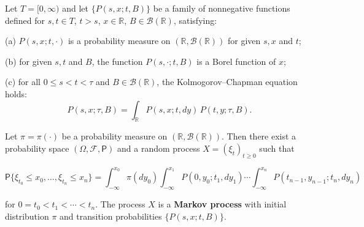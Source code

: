 Let $T = [0, \infty)$ and let $\{P(s, x; t, B)\}$ be a family of nonnegative functions defined for $s, t \in T$, $t > s$, $x \in \mathbb{R}$, $B \in \mathcal{B}(\mathbb{R})$, satisfying:

(a) $P(s, x; t, \cdot)$ is a probability measure on $(\mathbb{R}, \mathcal{B}(\mathbb{R}))$ for given $s, x$ and $t$;

(b) for given $s, t$ and $B$, the function $P(s, \cdot; t, B)$ is a Borel function of $x$;

(c) for all $0 \leq s < t < \tau$ and $B \in \mathcal{B}(\mathbb{R})$, the Kolmogorov–Chapman equation holds:
$$P(s, x; \tau, B) = \int_{\mathbb{R}} P(s, x; t, dy) \, P(t, y; \tau, B).$$

Let $\pi = \pi(\cdot)$ be a probability measure on $(\mathbb{R}, \mathcal{B}(\mathbb{R}))$. Then there exist a probability space $(\Omega, \mathcal{F}, \mathsf{P})$ and a random process $X = (\xi_t)_{t \geq 0}$ such that

$$\mathsf{P}\{\xi_{t_0} \leq x_0, \ldots, \xi_{t_n} \leq x_n\} = \int_{-\infty}^{x_0} \pi(dy_0) \int_{-\infty}^{x_1} P(0, y_0; t_1, dy_1) \cdots \int_{-\infty}^{x_n} P(t_{n-1}, y_{n-1}; t_n, dy_n)$$

for $0 = t_0 < t_1 < \cdots < t_n$. The process $X$ is a \textbf{Markov process} with initial distribution $\pi$ and transition probabilities $\{P(s, x; t, B)\}$.
